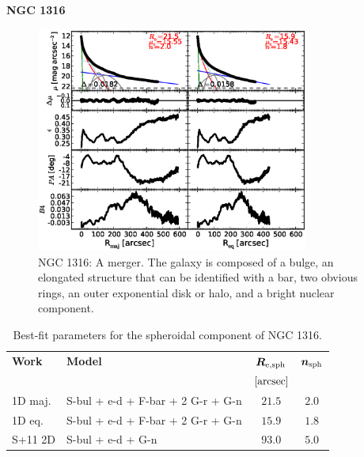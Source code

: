 \documentclass[preprint2]{emulateapj}
\newcommand{\fitfigurewidth}{0.8\textwidth}
\begin{document}
  \clearpage\newpage\noindent
  {\bf NGC 1316 \\}

  \begin{figure}[h]
  \begin{center}
  \includegraphics[width=\fitfigurewidth]{images/n1316_1Dfit.eps}
  \caption{NGC 1316:  
  A merger. 
  The galaxy is composed of a bulge, an elongated structure that can be identified with a bar, 
  two obvious rings, an outer exponential disk or halo, and a bright nuclear component. }
  \end{center}
  \end{figure}

  \begin{table}[h]
  \small
  \caption{Best-fit parameters for the spheroidal component of NGC 1316.}
  \begin{center}
  \begin{tabular}{llcc}
  \hline
  {\bf Work} & {\bf Model}   & $\bm R_{\rm e,sph}$    & $\bm n_{\rm sph}$ \\
    &  &  $[\rm arcsec]$ & \\
  \hline
  1D maj. & S-bul + e-d + F-bar + 2 G-r + G-n & $21.5$  &  $2.0$ \\
  1D eq.  & S-bul + e-d + F-bar + 2 G-r + G-n & $15.9$  &  $1.8$ \\
  \hline
  S+11 2D      & S-bul + e-d + G-n & $93.0$  &  $5.0$ \\
  \hline
  \end{tabular}
  \end{center}
  \label{tab:n1316}
  \end{table}
\end{document}
